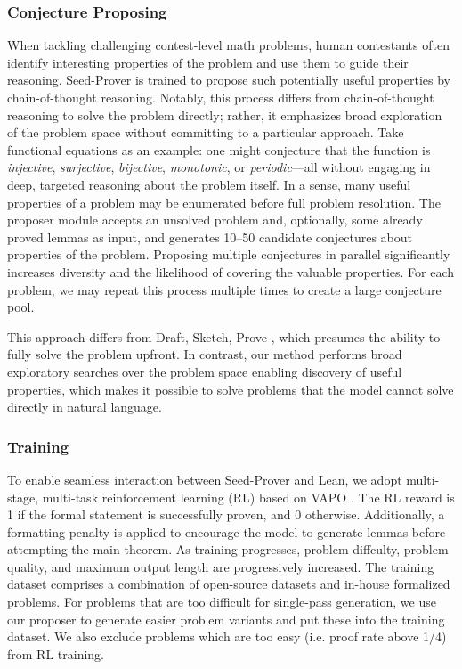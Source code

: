 \subsubsection{Conjecture Proposing}
When tackling challenging contest-level math problems, human contestants often identify interesting properties of the problem and use them to guide their reasoning. Seed-Prover is trained to propose such potentially useful properties by chain-of-thought reasoning. Notably, this process differs from chain-of-thought reasoning to solve the problem directly; rather, it emphasizes broad exploration of the problem space without committing to a particular approach. Take functional equations as an example: one might conjecture that the function is \textit{injective}, \textit{surjective}, \textit{bijective}, \textit{monotonic}, or \textit{periodic}—all without engaging in deep, targeted reasoning about the problem itself. In a sense, many useful properties of a problem may be enumerated before full problem resolution.
The proposer module accepts an unsolved problem and, optionally, some already proved lemmas as input, and generates 10–50 candidate conjectures about properties of the problem. Proposing multiple conjectures in parallel significantly increases diversity and the likelihood of covering the valuable properties.
For each problem, we may repeat this process multiple times to create a large conjecture pool.

This approach differs from Draft, Sketch, Prove \citep{jiangdraft}, which presumes the ability to fully solve the problem upfront. In contrast, our method performs broad exploratory searches over the problem space enabling discovery of useful properties, which makes it possible to solve problems that the model cannot solve directly in natural language.

\subsubsection{Training}
To enable seamless interaction between Seed-Prover and Lean, we adopt multi-stage, multi-task reinforcement learning (RL) based on VAPO \citep{vapo}. The RL reward is 1 if the formal statement is successfully proven, and 0 otherwise. Additionally, a formatting penalty is applied to encourage the model to generate lemmas before attempting the main theorem. As training progresses, problem diffculty, problem quality, and maximum output length are progressively increased. The training dataset comprises a combination of open-source datasets \citep{yinglean, numina_math_datasets, albalak2025bigmathlargescalehighqualitymath, yu2025dapo, peng2025criticlean} and in-house formalized problems. For problems that are too difficult for single-pass generation, we use our proposer to generate easier problem variants and put these into the training dataset. We also exclude problems which are too easy (i.e. proof rate above 1/4) from RL training.

